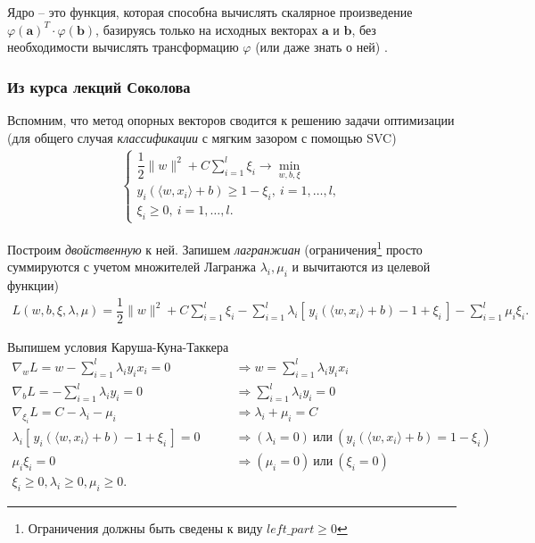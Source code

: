 \documentclass[%
	11pt,
	a4paper,
	utf8,
		]{article}
\begin{document}
Ядро -- это функция, которая способна вычислять скалярное произведение $ \varphi(\mathbf{a})^T \cdot \varphi (\mathbf{b}) $, базируясь только на исходных векторах $ \mathbf{a} $ и $ \mathbf{b} $, без необходимости вычислять трансформацию $ \varphi $ (или даже знать о ней) \cite[]{geron:hands_on_ml}.

\subsubsection{Из курса лекций Соколова}

Вспомним, что метод опорных векторов сводится к решению задачи оптимизации (для общего случая \emph{классификации} с мягким зазором с помощью SVC)
\begin{align*}
	\begin{cases}
		\dfrac{1}{2} \| w \|^2 + C \sum\limits_{i=1}^{l} \xi_i \to \min\limits_{ w, b, \xi }\\
		y_i ( \langle w, x_i \rangle + b) \geqslant 1 - \xi_i, \ i = 1, \ldots, l,\\
		\xi_i \geqslant 0, \ i = 1, \ldots, l.
	\end{cases}
\end{align*}

Построим \emph{двойственную} к ней. Запишем \emph{лагранжиан} (ограничения\footnote{Ограничения должны быть сведены к виду $ left\_part \geqslant 0 $} просто суммируются с учетом множителей Лагранжа $ \lambda_i, \mu_i $ и вычитаются из целевой функции)
\begin{align*}
	L(w, b, \xi, \lambda, \mu) = \dfrac{1}{2} \| w \|^2 + C \sum_{i=1}^{l} \xi_i - \sum_{i=1}^{l} \lambda_i [\, y_i (\langle w, x_i \rangle + b) - 1 + \xi_i \,] - \sum_{i=1}^{l} \mu_i \xi_i.
\end{align*}

Выпишем условия Каруша-Куна-Таккера
\begin{align}
	\nabla_w L = w - \sum_{i=1}^{l} \lambda_i y_i x_i = 0 \qquad &\Rightarrow w = \sum_{i=1}^{l} \lambda_i y_i x_i \label{eq:w}\\
	\nabla_b L = - \sum_{i=1}^l \lambda_i y_i = 0 \qquad &\Rightarrow \sum_{i=1}^l \lambda_i y_i = 0 \\
	\nabla_{\xi_i} L = C - \lambda_i - \mu_i \qquad &\Rightarrow \lambda_i + \mu_i = C \\
	\lambda_i [\, y_i ( \langle w, x_i \rangle + b) - 1 + \xi_i \,] = 0 \qquad &\Rightarrow (\lambda_i = 0) \ \text{или} \ (y_i ( \langle w, x_i \rangle + b ) = 1 - \xi_i) \label{eq:xi} \\
	\mu_i \xi_i = 0 \qquad &\Rightarrow (\mu_i = 0) \  \text{или} \ (\xi_i = 0) \\
	\xi_i \geqslant 0, \lambda_i \geqslant 0, \mu_i \geqslant 0.
\end{align}
\end{document}
